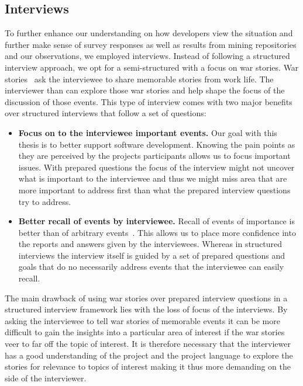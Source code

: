 \subsection{Interviews}
To further enhance our understanding on how developers view the situation and further make sense of survey responses as well as results from mining repositories and our observations, we employed interviews.
Instead of following a structured interview approach, we opt for a semi-structured with a focus on war stories.
War stories~\cite{lutters:ist:2007} ask the interviewee to share memorable stories from work life.
The interviewer than can explore those war stories and help shape the focus of the discussion of those events.
This type of interview comes with two major benefits over structured interviews that follow a set of questions:

\begin{itemize}
\item\textbf{Focus on to the interviewee important events.}
Our goal with this thesis is to better support software development.
Knowing the pain points as they are perceived by the projects participants allows us to focus important issues.
With prepared questions the focus of the interview might not uncover what is important to the interviewee and thus we might miss area that are more important to address first than what the prepared interview questions try to address.
\item\textbf{Better recall of events by interviewee.}
Recall of events of importance is better than of arbitrary events~\cite{lutters:ist:2007}.
This allows us to place more confidence into the reports and answers given by the interviewees.
Whereas in structured interviews the interview itself is guided by a set of prepared questions and goals that do no necessarily address events that the interviewee can easily recall.
\end{itemize}

The main drawback of using war stories over prepared interview questions in a structured interview framework lies with the loss of focus of the interviews.
By asking the interviewee to tell war stories of memorable events it can be more difficult to gain the insights into a particular area of interest if the war stories veer to far off the topic of interest.
It is therefore necessary that the interviewer has a good understanding of the project and the project language to explore the stories for relevance to topics of interest making it thus more demanding on the side of the interviewer.

